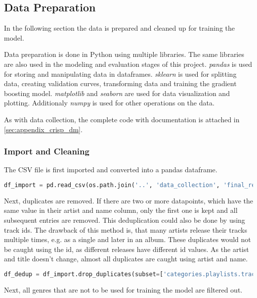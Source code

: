 \subsection{Data Preparation}
\label{sec:Data Preparation}

In the following section the data is prepared and cleaned up for training the model.

Data preparation is done in Python using multiple libraries. The same libraries
are also used in the modeling and evaluation stages of this project.
\emph{pandas} is used for storing and manipulating data in dataframes.
\emph{sklearn} is used for splitting data, creating validation curves,
transforming data and training the gradient boosting model.
\emph{matplotlib} and \emph{seaborn} are used for data visualization and plotting.
Additionaly \emph{numpy} is used for other operations on the data.

As with data collection, the complete code with documentation is attached in \ref{sec:appendix_crisp_dm}.

\subsubsection{Import and Cleaning}


The CSV file is first imported and converted into a pandas dataframe.

\begin{lstlisting}[language=Python]
    df_import = pd.read_csv(os.path.join('..', 'data_collection', 'final_result.csv'))
\end{lstlisting}

Next, duplicates are removed. If there are two or more datapoints, which have the same value in their artist
and name column, only the first one is kept and all subsequent entries are removed.
This deduplication could also be done by using track ids. The drawback of this method is, that many artists
release their tracks multiple times, e.g. as a single and later in an album. These duplicates would not be
caught using the id, as different releases have different id values. As the artist and title doesn't change, almost
all duplicates are caught using artist and name.

\begin{lstlisting}[language=Python]
    df_dedup = df_import.drop_duplicates(subset=['categories.playlists.tracks.artists', 'categories.playlists.tracks.name'])
\end{lstlisting}

Next, all genres that are not to be used for training the model are filtered out.

